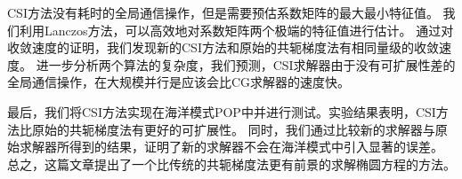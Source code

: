 CSI方法没有耗时的全局通信操作，但是需要预估系数矩阵的最大最小特征值。
我们利用Lanczos方法，可以高效地对系数矩阵两个极端的特征值进行估计。
通过对收敛速度的证明，我们发现新的CSI方法和原始的共轭梯度法有相同量级的收敛速度。
进一步分析两个算法的复杂度，我们预测，CSI求解器由于没有可扩展性差的全局通信操作，在大规模并行是应该会比CG求解器的速度快。

最后，我们将CSI方法实现在海洋模式POP中并进行测试。实验结果表明，CSI方法比原始的共轭梯度法有更好的可扩展性。
同时，我们通过比较新的求解器与原始求解器所得到的结果，证明了新的求解器不会在海洋模式中引入显著的误差。
总之，这篇文章提出了一个比传统的共轭梯度法更有前景的求解椭圆方程的方法。 

